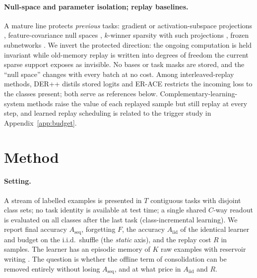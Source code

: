 \documentclass{article}
\begin{document}
\paragraph{Null-space and parameter isolation; replay baselines.} A mature line protects
\emph{previous} tasks: gradient or activation-subspace projections
\citep{farajtabar2020,saha2021,chaudhry2019}, feature-covariance null spaces
\citep{wangnscl2021}, $k$-winner sparsity with such projections \citep{abbasi2022}, frozen
subnetworks \citep{golkar2019,mallya2018}. We invert the protected direction: the ongoing
computation is held invariant while old-memory replay is written into degrees of freedom the
current sparse support exposes as invisible. No bases or task masks are stored, and the
``null space'' changes with every batch at no cost. Among interleaved-replay methods, DER++
\citep{buzzega2020} distils stored logits and ER-ACE \citep{caccia2022} restricts the incoming
loss to the classes present; both serve as references below. Complementary-learning-system
methods \citep{arani2022,pham2021} raise the value of each replayed sample but still replay at
every step, and learned replay scheduling \citep{klasson2023} is related to the trigger study
in Appendix~\ref{app:budget}.

\section{Method}
\label{sec:method}

\paragraph{Setting.} A stream of labelled examples is presented in $T$ contiguous tasks with
disjoint class sets; no task identity is available at test time; a single shared $C$-way
readout is evaluated on all classes after the last task (class-incremental learning). We
report final accuracy $A_{\mathrm{seq}}$, forgetting $F$, the accuracy $A_{\mathrm{iid}}$ of
the identical learner and budget on the i.i.d.\ shuffle (the \emph{static} axis), and the
replay cost $R$ in samples. The learner has an episodic memory of $K$ raw examples with
reservoir writing \citep{vitter1985}. The question is whether the offline term of
consolidation can be removed entirely without losing $A_{\mathrm{seq}}$, and at what price in
$A_{\mathrm{iid}}$ and $R$.
\end{document}
